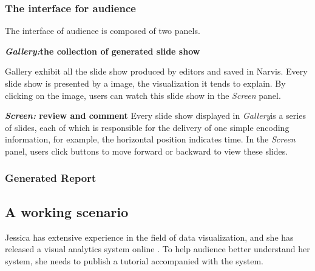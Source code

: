 \subsubsection{The interface for audience}
The interface of audience is composed of two panels.

\textbf{\textit{Gallery:}the collection of generated slide show}
 
Gallery exhibit all the slide show produced by editors and saved in Narvis. Every slide show is presented by a image, the visualization it tends to explain. By clicking on the image, users can watch this slide show in the \textit{Screen} panel. 

\textbf{\textit{Screen:}  review and comment}
Every slide show displayed in \textit{Gallery}is a series of slides, each of which is responsible for the delivery of one simple encoding information, for example, the horizontal position indicates time. In the \textit{Screen} panel, users click buttons to move forward or backward to view these slides. 
\subsubsection{Generated Report}

\subsection{A working scenario}
Jessica has extensive experience in the field of data visualization, and she has released a visual analytics system online . To help audience better understand her system, she needs to publish a tutorial accompanied with the system.

